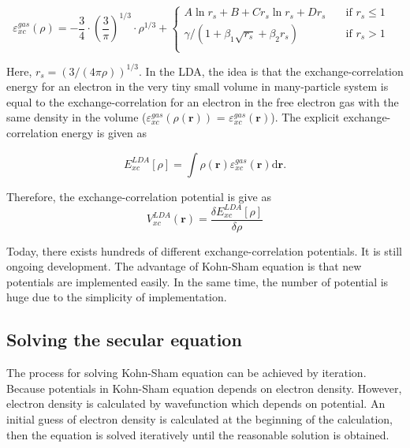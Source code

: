 \documentclass[a4paper, 12pt, titlepage,oneside,drop]{kthesis}
\begin{document}
\begin{equation} 
 \varepsilon_{xc}^{gas}(\rho) = -\frac{3}{4}\cdot(\frac{3}{\pi})^{1/3}\cdot{\rho}^{1/3} + 
 \begin{cases} A\ln{r_s}+B+C{r_s}\ln{r_s}+D{r_s} & \quad \mbox{if ${r_s} \leq 1 $} 
\\
 \gamma / (1+\beta_1 \sqrt{{r_s}}+ \beta_2 {r_s}) & \quad \mbox{if ${r_s} > 1$ }\\ 
\end{cases} 
\end{equation}

Here, $r_s = (3 / (4 \pi \rho))^{1/3}$. In the LDA, the idea is that the exchange-correlation energy for an electron in the very tiny small volume in many-particle system is equal to the exchange-correlation for an electron 
in the free electron gas with the same density in the volume ($\varepsilon_{xc}^{gas}(\rho(\textbf{r}))$ = $\varepsilon_{xc}^{gas}(\textbf{r})$). The explicit exchange-correlation energy is given as

\begin{equation}
 E^{LDA}_{xc}[\rho] = \int \rho(\textbf{r}) \varepsilon_{xc}^{gas}( \textbf{r} ) \mathrm{d} \textbf{r}.
\end{equation}

Therefore, the exchange-correlation potential is give as
\begin{equation}
 V_{xc}^{LDA}(\textbf{r}) = \frac{\delta  E^{LDA}_{xc}[\rho]}{\delta \rho}
\end{equation}

Today, there exists hundreds of different exchange-correlation potentials. It is still ongoing development. The advantage of Kohn-Sham equation is that new potentials are implemented easily. In the same time, the number of potential is huge due to
the simplicity of implementation.

\subsection{Solving the secular equation}

The process for solving Kohn-Sham equation can be achieved by iteration. Because potentials in Kohn-Sham equation depends on electron density. However, electron density is calculated by wavefunction which depends on potential. 
An initial guess of electron density is calculated at the beginning of the calculation, then the equation is solved iteratively until the reasonable solution is obtained.
\end{document}

